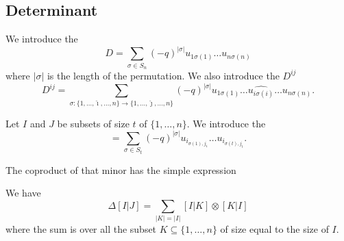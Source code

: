 \subsection{Determinant}

We introduce the 
\begin{equation}
	D=\sum_{\sigma\in S_n}(-q)^{| \sigma |}u_{1\sigma(1)}\ldots u_{n\sigma(n)}
\end{equation}
where $| \sigma |$ is the length of the permutation. We also introduce the  $D^{ij}$
\begin{equation}        \label{Eqdefdijmineurquan}
	D^{ij}=\sum_{\sigma\colon \{ 1,\ldots,\hat\imath,\ldots,n \}\to \{ 1,\ldots,\hat\jmath,\ldots,n \}}(-q)^{| \sigma |}u_{1\sigma(1)}\ldots\widehat{u_{i\sigma(i)}}\ldots u_{n\sigma(n)}.
\end{equation}

Let $I$ and $J$ be subsets of size $t$ of $\{ 1,\ldots,n \}$. We introduce the 
\begin{equation}
	[I|J]=\sum_{\sigma\in S_t}(-q)^{| \sigma |} u_{i_{\sigma(1),j_1}}\ldots u_{i_{\sigma(t),j_t}}.
\end{equation}

The coproduct of that minor has the simple expression\cite{Goodearl}
\begin{proposition}     \label{LemMineurQuantique}
	We have
	\begin{equation}
		\Delta[I|J]=\sum_{| K |=| I |}[I|K]\otimes[K|I]
	\end{equation}
	where the sum is over all the subset $K\subseteq\{ 1,\ldots,n \}$ of size equal to the size of $I$.
\end{proposition}

